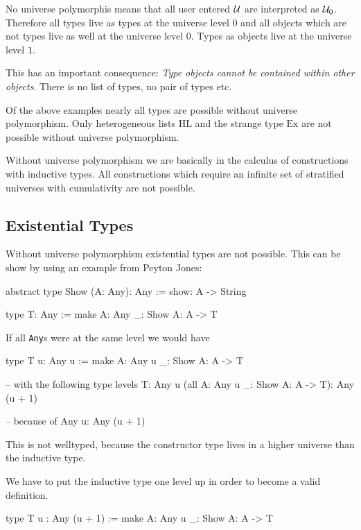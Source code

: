 No universe polymorphis means that all user entered ${\mathcal U}$ are interpreted as
${\mathcal U}_0$. Therefore all types live as types at the universe level $0$ and all
objects which are not types live as well at the universe level $0$. Types as
objects live at the universe level $1$.

This has an important consequence: \emph{Type objects cannot be contained within
other objects}. There is no list of types, no pair of types etc.

Of the above examples nearly all types are possible without universe
polymorphism. Only heterogeneous lists $\text{HL}$ and the strange type
$\text{Ex}$ are not possible without universe polymorphism.

Without universe polymorphism we are basically in the calculus of constructions
with inductive types. All constructions which require an infinite set of
stratified universes with cumulativity are not possible.





\subsection{Existential Types}

Without universe polymorphism existential types are not possible.
This can be show by using an example from Peyton Jones:

\begin{alba}
    abstract type Show (A: Any): Any :=
        show: A -> String

    type T: Any :=
        make {A: Any} {_: Show A}: A -> T
\end{alba}

If all {\tt Any}s were at the same level we would have
\begin{alba}
    type T {u}: Any u :=
        make {A: Any u} {_: Show A}: A -> T

    -- with the following type levels
    T:                                      Any u
    (all {A: Any u} {_: Show A}: A -> T):   Any (u + 1)

    -- because of
    Any u: Any (u + 1)
\end{alba}
%
This is not welltyped, because the constructor type lives in a higher universe
than the inductive type.

We have to put the inductive type one level up in order to become a valid
definition.

\begin{alba}
    type T {u} : Any (u + 1) :=
        make {A: Any u} {_: Show A}: A -> T
\end{alba}
